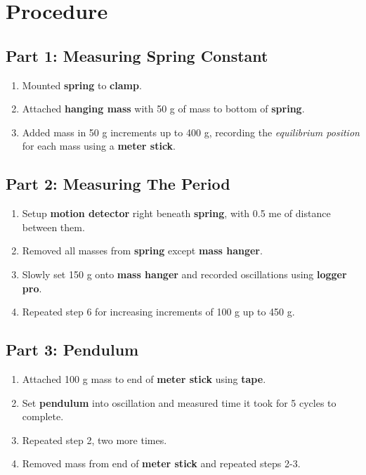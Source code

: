 
\section{Procedure}
\vspace{-0.5cm}
\singlespacing


\subsection{Part 1: Measuring Spring Constant}

\begin{enumerate}
		\item Mounted \textbf{spring }to \textbf{clamp}.

		\item Attached \textbf{hanging mass }with 50 g of mass to bottom of \textbf{spring}.

		\item Added mass in 50 g increments up to 400 g, recording the \emph{equilibrium
			position }for each mass using a \textbf{meter stick}.
	\end{enumerate}


\subsection{Part 2: Measuring The Period}

\begin{enumerate}[resume]
		\item Setup \textbf{motion detector }right beneath \textbf{spring}, with 0.5
			me of distance between them.

		\item Removed all masses from \textbf{spring }except \textbf{mass hanger}.

		\item Slowly set 150 g onto \textbf{mass hanger }and recorded oscillations using
			\textbf{logger pro}.

		\item Repeated step 6 for increasing increments of 100 g up to 450 g.
	\end{enumerate}

\subsection{Part 3: Pendulum}

\begin{enumerate}[resume]
		\item Attached 100 g mass to end of \textbf{meter stick }using \textbf{tape}.

		\item Set \textbf{pendulum }into oscillation and measured time it took for 5
			cycles to complete.

		\item Repeated step 2, two more times.

		\item Removed mass from end of \textbf{meter stick }and repeated steps 2-3.
	\end{enumerate}

\newpage




